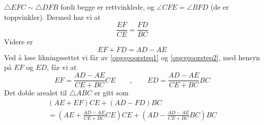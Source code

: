 





\footnotesize
\opgt 	

$ {\triangle EFC \sim \triangle DFB} $ fordi begge er rettvinklede, og $ {\angle CFE = \angle BFD}$ (de er toppvinkler). Dermed har vi at
\begin{equation}\label{opggeoqrsteq1}
	\frac{EF}{CE}=\frac{FD}{BC} 
\end{equation}
Videre er
\begin{equation}\label{opggeoqrsteq2}
	EF+FD= AD-AE
\end{equation}
Ved å løse likningssettet vi får av \eqref{opggeoqrsteq1} og \eqref{opggeoqrsteq2}, med hensyn på $ EF $ og $ ED $, får vi at
\[ 
EF = \frac{AD-AE}{CE+BC}CE\qquad,\qquad  ED=\frac{AD-AE}{CE+BC}BC
\]
Det doble arealet til $ \triangle ABC $ er gitt som
\begin{multline*}
(AE+EF)CE+(AD-FD)BC \\=\left(AE+\frac{AD-AE}{CE+BC}CE\right)CE+\left(AD-\frac{AD-AE}{CE+BC}BC\right)BC	
\end{multline*}


